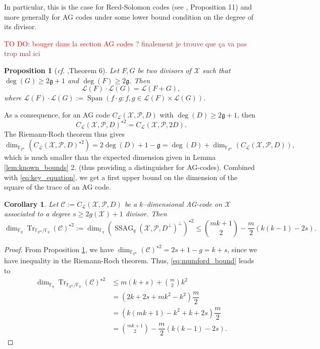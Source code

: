 \documentclass[a4paper]{article}
\newtheorem{proposition}[thm]{Proposition}
\newtheorem{coro}[thm]{Corollary}
\theoremstyle{definition}
\theoremstyle{remark}
\newcommand{\calP}{\mathcal{P}}
\newcommand{\calL}{\mathcal{L}}
\newcommand{\calC}{\mathcal{C}}
\newcommand{\calX}{\mathcal{X}}
\newcommand{\fqm}{\mathbb{F}_{q^m}}
\newcommand{\fq}{\mathbb{F}_{q}}
\newcommand{\Tr}[1]{\operatorname{Tr}_{\mathbb{F}_{q^m}/\fq}\left(#1\right)}
\newcommand{\Span}[1]{\operatorname{Span}\left(#1\right)}
\newcommand{\ssag}[1]{\operatorname{SSAG}_{q}\left(#1\right)}
\newcommand\TODO[1]{\textcolor{red}{TO DO: #1}}
\newcommand\mathieu[1]{\textcolor{brown}{#1}}
\begin{document}
In particular, this is the case for Reed-Solomon codes (see \cite{MT21}, Proposition 11) and more generally for AG codes under some lower bound condition on the degree of its divisor.

\TODO{bouger dans la section AG codes ?} \mathieu{finalement je trouve que ça va pas trop mal ici}

\begin{proposition}[\emph{cf.} \cite{Mum70},Theorem 6] \label{prop:mumford_result}
Let $F,G$ be two divisors of $\calX$ such that $\deg(G) \geq 2\mathfrak{g}+1$ and $\deg(F) \geq 2\mathfrak{g}$. Then
\[ \calL(F) \cdot \calL(G) = \calL(F+G),\]
where $\calL(F) \cdot \calL(G) := \Span{ f \cdot g : f,g \in \calL(F) \times \calL(G)}$.
\end{proposition}

\noindent As a consequence, for an AG code  $C_{\calL}(\calX,\mathcal{P},D)$ with $\deg(D) \geq 2\mathfrak{g}+1$, then 
\[ C_{\calL}(\calX,\mathcal{P},D)^{\star2} = C_{\calL}(\calX,\calP,2D).\]
The Riemann-Roch theorem thus gives
\[ \dim_{\fqm}(C_{\calL}(\calX,\mathcal{P},D)^{\star2}) = 2\deg(D)+1-\mathfrak{g}= \deg(D) + \dim_{\fqm}(C_{\calL}(\calX,\mathcal{P},D)), \]
which is much smaller than the expected dimension given in Lemma \ref{lem:known_bounds} 2. (thus providing a distinguisher for AG-codes). Combined with \eqref{eq:key_equation}, we get a first upper bound on the dimension of the square of the trace of an AG code.


\begin{coro} \label{coro:1st_bound_mumford}
Let $\mathcal{C} := C_{\calL}(\calX,\mathcal{P},D)$ be a $k$--dimensional AG-code on $\calX$ associated to a degree $s \geq 2g(\calX)+1$ divisor. Then
\[ \dim_{\fq}\Tr{\calC}^{\star2} := \dim_{\fq} (\ssag{\calX,\calP,D^{\perp}}^{\perp})^{\star2}  \leq \binom{mk+1}{2} - \dfrac{m}{2} (k(k-1)-2s).\]
\end{coro}


\begin{proof}
From Proposition \ref{prop:mumford_result}, we have $\dim_{\fqm}(\calC)^{\star2} = 2s+1-g = k+s$, since we have inequality in the Riemann-Roch theorem. Thus, \eqref{eq:mumford_bound} leads to
\begin{align*}
   \dim_{\fq}\Tr{\calC}^{\star2} &\leq m(k+s) + \binom{m}{2}k^2 \\
                                       &= (2k+2s+mk^2-k^2) \dfrac{m}{2} \\
                                       &= (k(mk+1)-k^2+k+2s) \dfrac{m}{2} \\
                                       &= \binom{mk+1}{2} - \dfrac{m}{2}(k(k-1)-2s) .
\end{align*}
\end{proof}
\end{document}
